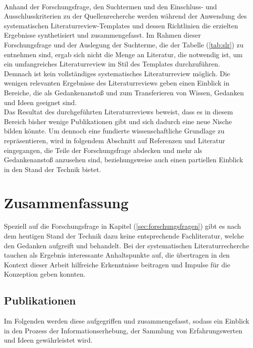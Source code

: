         \\
        Anhand der Forschungsfrage, den Suchtermen und den Einschluss- und Ausschlusskriterien zu der Quellenrecherche werden während der Anwendung
        des systematischen Literaturreview-Templates und dessen Richtlinien die erzielten Ergebnisse synthetisiert und zusammengefasst. Im Rahmen 
        dieser Forschungsfrage und der Auslegung der Suchterme, die der Tabelle (\ref{tab:slr}) zu entnehmen sind, ergab sich nicht die Menge an Literatur, 
        die notwendig ist, um ein umfangreiches Literaturreview im Stil des Templates durchzuführen. Demnach ist kein vollständiges systematisches Literaturreview 
        möglich. Die wenigen relevanten Ergebnisse des Literaturreviews geben einen Einblick in Bereiche, die als Gedankenanstoß und zum Transferieren von 
        Wissen, Gedanken und Ideen geeignet sind. 
        \\
        \linebreak
        Das Resultat des durchgeführten Literaturreviews beweist, dass es in diesem Bereich bisher wenige Publikationen gibt und sich dadurch eine neue Nische bilden könnte. 
        Um dennoch eine fundierte wissenschaftliche Grundlage zu repräsentieren, wird in 
        folgendem Abschnitt auf Referenzen und Literatur eingegangen, die Teile der Forschungsfrage abdecken und mehr als Gedankenanstoß 
        anzusehen sind, beziehungsweise auch einen partiellen Einblick in den Stand der Technik bietet. 
\section{Zusammenfassung} 
    Speziell auf die Forschungsfrage in Kapitel (\ref{sec:forschungsfragen}) gibt es nach dem heutigen Stand der Technik dazu keine entsprechende  
    Fachliteratur, welche den Gedanken aufgreift und behandelt. 
    Bei der systematischen Literaturrecherche tauchen als Ergebnis interessante Anhaltspunkte auf, die übertragen in den Kontext dieser Arbeit 
    hilfreiche Erkenntnisse beitragen und Impulse für die Konzeption geben konnten. 
    
    \subsection{Publikationen}
    \label{subsec:publications}
        Im Folgenden werden diese aufgegriffen und zusammengefasst, sodass ein Einblick in den Prozess der 
        Informationserhebung, der Sammlung von Erfahrungswerten und Ideen gewährleistet wird.
        
